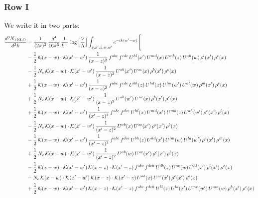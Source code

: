 \documentclass[9pt]{article}
\numberwithin{equation}{section}
\begin{document}
\subsubsection{Row I}
We write it in two parts: 
\begin{align}
\frac{d^{3}N_{1\,\mathrm{NLO}}}{d^{3}k} & = \frac{1}{(2\pi)^{3}}\,\frac{g^{4}}{16\pi^{5}}\,\frac{1}{k^{+}}\,\log\Big[\frac{\vee}{\Lambda}\Big]\int_{x,x',z,w,w'}e^{-ik(w'-w)}\,\Bigg[\notag\\ & -\frac{1}{2}\,\mathcal{K}(x-w)\cdot\mathcal{K}(x'-w')\,\frac{1}{(x-z)^{2}}\,f^{abc}\,f^{cde}\,U^{hl}(x')\,U^{md}(x)\,U^{mb}(z)\,U^{ah}(w)\,\rho^{l}(x')\,\rho^{e}(x)\notag\\
& -\frac{1}{2}\,N_{c}\,\mathcal{K}(x-w)\cdot\mathcal{K}(x'-w')\,\frac{1}{(x-z)^{2}}\,U^{ab}(x')\,U^{ac}(x)\,\rho^{b}(x')\,\rho^{c}(x)\notag\\
& +\frac{1}{2}\,\mathcal{K}(x-w)\cdot\mathcal{K}(x'-w')\,\frac{1}{(x-z)^{2}}\,f^{abc}\,f^{cde}\,U^{bh}(z)\,U^{hd}(x)\,U^{lm}(w')\,U^{al}(w)\,\rho^{m}(x')\,\rho^{e}(x)\notag\\
& +\frac{1}{2}\,N_{c}\,\mathcal{K}(x-w)\cdot\mathcal{K}(x'-w')\,\frac{1}{(x-z)^{2}}\,U^{ab}(w')\,U^{ac}(x)\,\rho^{b}(x')\,\rho^{c}(x)\notag\\
& +\frac{1}{2}\,\mathcal{K}(x-w)\cdot\mathcal{K}(x'-w')\,\frac{1}{(x'-z)^{2}}\,f^{abc}\,f^{dce}\,U^{hl}(x)\,U^{md}(x')\,U^{mb}(z)\,U^{ah}(w')\,\rho^{e}(x')\,\rho^{l}(x)\notag\\
& -\frac{1}{2}\,N_{c}\,\mathcal{K}(x-w)\cdot\mathcal{K}(x'-w')\,\frac{1}{(x'-z)^{2}}\,U^{ab}(x)\,U^{ac}(x')\,\rho^{c}(x')\,\rho^{b}(x)\notag\\
& -\frac{1}{2}\,\mathcal{K}(x-w)\cdot\mathcal{K}(x'-w')\,\frac{1}{(x'-z)^{2}}\,f^{abc}\,f^{dce}\,U^{bh}(z)\,U^{hd}(x')\,U^{lm}(w)\,U^{la}(w')\,\rho^{e}(x')\,\rho^{m}(x)\notag\\
& +\frac{1}{2}\,N_{c}\,\mathcal{K}(x-w)\cdot\mathcal{K}(x'-w')\,\frac{1}{(x'-z)^{2}}\,U^{ab}(w)\,U^{ac}(x')\,\rho^{c}(x')\,\rho^{b}(x)\notag\\
& -\frac{1}{2}\,\mathcal{K}(x-w)\cdot\mathcal{K}(x'-w')\,\mathcal{K}(x-z)\cdot\mathcal{K}(x'-z)\,f^{abc}\,f^{deh}\,U^{db}(z)\,U^{ae}(w)\,U^{hl}(x')\,\rho^{l}(x')\,\rho^{c}(x)\notag\\
& -N_{c}\,\mathcal{K}(x-w)\cdot\mathcal{K}(x'-w')\,\mathcal{K}(x-z)\cdot\mathcal{K}(x'-z)\,U^{ab}(x)\,U^{ac}(x')\,\rho^{c}(x')\,\rho^{b}(x)\notag\\
& +\frac{1}{2}\,\mathcal{K}(x-w)\cdot\mathcal{K}(x'-w')\,\mathcal{K}(x-z)\cdot\mathcal{K}(x'-z)\,f^{abc}\,f^{deh}\,U^{bl}(z)\,U^{ld}(x')\,U^{me}(w')\,U^{am}(w)\,\rho^{h}(x')\,\rho^{c}(x)\notag\\

\end{align}
\end{document}
